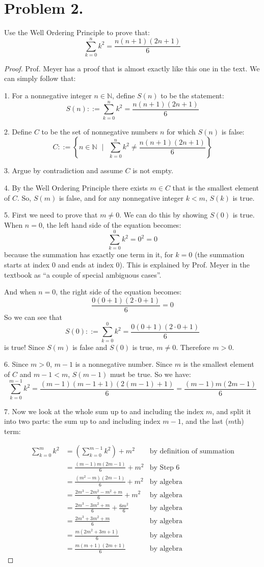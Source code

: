 \documentclass[14pt]{extarticle}
\begin{document}
\section{Problem 2.}
Use the Well Ordering Principle to prove that:
$$
\sum_{k=0}^{n}k^2 = \frac{n(n+1)(2n+1)}{6}
$$
\begin{proof}
Prof. Meyer has a proof that is almost exactly like this one in the text. We can simply follow that:

1. For a nonnegative integer $n \in \mathbb{N}$, define $S(n)$ to be the statement: 
$$
S(n) ::= \sum_{k=0}^{n}k^2 = \frac{n(n+1)(2n+1)}{6}
$$

2. Define $C$ to be the set of nonnegative numbers $n$ for which $S(n)$ is false:
$$
C::= \left\{n \in \mathbb{N}\,\,\,\, \biggr\vert \,\,\,\, \sum_{k=0}^{n}k^2 \neq \frac{n(n+1)(2n+1)}{6}\right\}
$$

3. Argue by contradiction and assume $C$ is not empty.

4. By the Well Ordering Principle there exists $m \in C$ that is the smallest element of $C$. So, $S(m)$ is false, and for any nonnegative integer $k < m$, $S(k)$ is true. 

5. First we need to prove that $m \neq 0$. We can do this by showing $S(0)$ is true. When $n = 0$, the left hand side of the equation becomes:
$$
\sum_{k=0}^{0}k^2 = 0^2 = 0
$$
because the summation has exactly one term in it, for $k = 0$ (the summation starts at index 0 and ends at index 0). This is explained by Prof. Meyer in the textbook as ``a couple of special ambiguous cases''.

And when $n = 0$, the right side of the equation becomes:
$$
\frac{0(0+1)(2\cdot0+1)}{6} = 0
$$
So we can see that 
$$
S(0) ::= \sum_{k=0}^{0}k^2 = \frac{0(0+1)(2\cdot0+1)}{6}
$$
is true! Since $S(m)$ is false and $S(0)$ is true, $m \neq 0$. Therefore $m > 0$.

6. Since $m > 0$, $m-1$ is a nonnegative number. Since $m$ is the smallest element of $C$ and $m-1 < m$, $S(m-1)$ must be true. So we have:
$$
\sum_{k=0}^{m-1}k^2 = \frac{(m-1)(m-1+1)(2(m-1)+1)}{6} = \frac{(m-1)m(2m-1)}{6}
$$

7. Now we look at the whole sum up to and including the index $m$, and split it into two parts: the sum up to and including index $m-1$, and the last ($m$th) term:

\begin{align}
\sum_{k=0}^{m}k^2 &= \left(\sum_{k=0}^{m-1}k^2\right) + m^2 & \text{by definition of summation}\\
&= \frac{(m-1)m(2m-1)}{6} + m^2 & \text{by Step 6}\\
&= \frac{(m^2-m)(2m-1)}{6} + m^2 & \text{by algebra}\\
&= \frac{2m^3-2m^2-m^2+m}{6} + m^2 & \text{by algebra}\\
&= \frac{2m^3-3m^2+m}{6} + \frac{6m^2}{6} & \text{by algebra}\\
&= \frac{2m^3+3m^2+m}{6} & \text{by algebra}\\
&= \frac{m(2m^2+3m+1)}{6} & \text{by algebra}\\
&= \frac{m(m+1)(2m+1)}{6} & \text{by algebra}
\end{align}


\end{proof}
\end{document}
